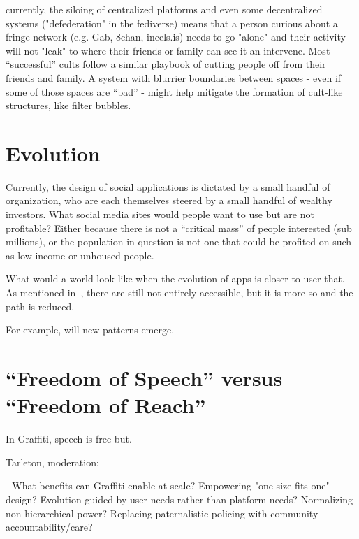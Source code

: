 currently, the siloing of centralized platforms and
even some decentralized systems ("defederation" in the fediverse)
means that a person curious about a fringe network (e.g. Gab, 8chan, incels.is)
needs to go "alone" and their activity will not "leak" to where their friends or
family can see it an intervene. Most “successful” cults follow a similar playbook
of cutting people off from their friends and family. A system with blurrier boundaries
between spaces - even if some of those spaces are “bad” - might help mitigate the formation
of cult-like structures, like filter bubbles.

\section{Evolution}

Currently, the design of social applications is dictated by a small handful of organization,
who are each themselves steered by a small handful of wealthy investors.
What social media sites would people want to use but are not profitable?
Either because there is not a ``critical mass'' of people interested (sub millions),
or the population in question is not one that could be profited on such as low-income or unhoused people.

What would a world look like when the evolution of apps is closer to user that.
As mentioned in~\cite{graffiti}, there are still not entirely accessible, but it is
more so and the path is reduced.

For example, will new patterns emerge.

\section{``Freedom of Speech'' versus ``Freedom of Reach''}

In Graffiti, speech is free but.

Tarleton, moderation:


- What benefits can Graffiti enable at scale? Empowering "one-size-fits-one" design? Evolution guided by user needs rather than platform needs? Normalizing non-hierarchical power? Replacing paternalistic policing with community accountability/care?




